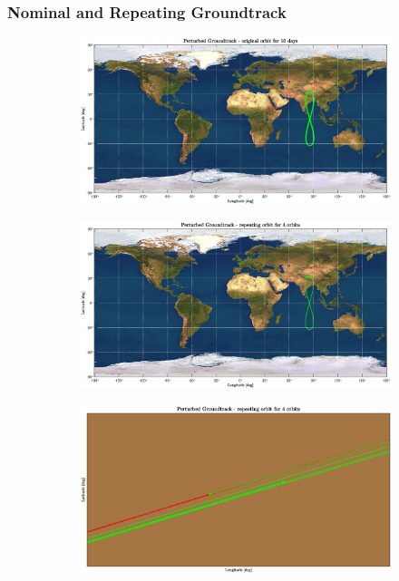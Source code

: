 \documentclass{article}
\begin{document}

\subsubsection{Nominal and Repeating Groundtrack}

\begin{figure}[H]
	\centering
	\begin{subfigure}[b]{0.45\textwidth}
		\includegraphics[width=\textwidth]{pg10d.eps}
		\caption{}
		\label{fig:5a}
	\end{subfigure}
	\hfill
	\begin{subfigure}[b]{0.45\textwidth}
		\includegraphics[width=\textwidth]{pgro4orb.eps}
		\caption{}
		\label{fig:5b}
	\end{subfigure}
	
	\vspace{1cm} 
	\begin{subfigure}[b]{0.45\textwidth}
		\includegraphics[width=\textwidth]{zoompgro4orb.eps}
		\caption{}
		\label{fig:5c}
	\end{subfigure}
	

\end{figure}
\end{document}

